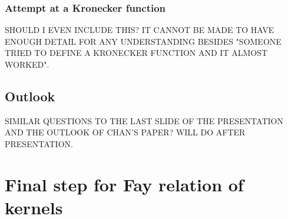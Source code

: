 \subsection{Attempt at a Kronecker function}
\cite{Cha22}
SHOULD I EVEN INCLUDE THIS?
IT CANNOT BE MADE TO HAVE ENOUGH DETAIL FOR ANY UNDERSTANDING BESIDES "SOMEONE TRIED TO DEFINE A KRONECKER FUNCTION AND IT ALMOST WORKED".

\section{Outlook}
SIMILAR QUESTIONS TO THE LAST SLIDE OF THE PRESENTATION AND THE OUTLOOK OF CHAN'S PAPER?
WILL DO AFTER PRESENTATION.




\appendix

\chapter{Final step for Fay relation of kernels}\label{appB12:kernelFay}

